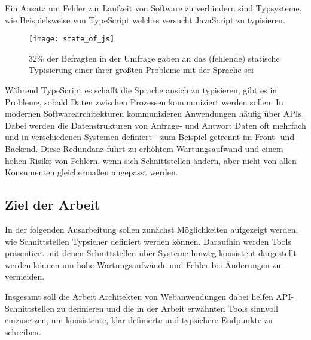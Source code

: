 Ein Ansatz um Fehler zur Laufzeit von Software zu verhindern sind Typsysteme, wie Beispielsweise von TypeScript welches versucht JavaScript zu typisieren.

\begin{figure}[H]
  \centering
  \texttt{[image: state\_of\_js]}
  \caption{32\% der Befragten in der  Umfrage gaben an das (fehlende) statische Typisierung einer ihrer größten Probleme mit der Sprache sei \cite{Greif_Burel_2024}}
\end{figure}

Während TypeScript es schafft die Sprache ansich zu typisieren, gibt es in Probleme, sobald Daten zwischen Prozessen
kommuniziert werden sollen.
In modernen Softwarearchitekturen kommunizieren Anwendungen häufig über APIs.
Dabei werden die Datenstrukturen von Anfrage- und Antwort Daten oft mehrfach und in verschiedenen Systemen definiert
- zum Beispiel getrennt im Front- und Backend.
Diese Redundanz führt zu erhöhtem Wartungsaufwand und einem hohen Risiko von Fehlern,
wenn sich Schnittstellen ändern, aber nicht von allen Konsumenten gleichermaßen angepasst werden.

\subsection{Ziel der Arbeit}

In der folgenden Ausarbeitung sollen zunächst Möglichkeiten aufgezeigt werden, wie Schnittstellen Typsicher definiert werden können.
Daraufhin werden Tools präsentiert mit denen Schnittstellen über Systeme hinweg konsistent dargestellt werden können um hohe Wartungsaufwände und Fehler bei Änderungen zu vermeiden.

Insgesamt soll die Arbeit Architekten von Webanwendungen dabei helfen API-Schnittstellen zu definieren und die in der Arbeit erwähnten Tools sinnvoll einzusetzen,
um konsistente, klar definierte und typsichere Endpunkte zu schreiben.
